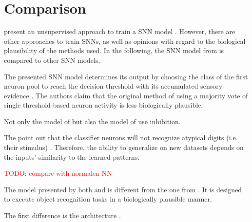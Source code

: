 \section{Comparison}
\label{sec:comparison}

\authorsSNN{} present an unsupervised approach to train a \ac{SNN} model \cite{SNN}.
However, there are other approaches to train \acp{SNN}, as well as opinions with regard to the biological plausibility of the methods used.
In the following, the \ac{SNN} model from \authorsSNN{} \cite{SNN} is compared to other \ac{SNN} models.


The presented \ac{SNN} model determines its output by 
choosing the class of the first neuron pool to reach the decision threshold with its accumulated sensory evidence \cite{STDP_like}.
The authors claim that the original method of using a majority vote of single threshold-based neuron activity is less biologically plausible.

Not only the model of \authorsSTDPlike{} \cite{STDP_like} but also the model of \authorsSNN{} \cite{SNN} use inhibition.

The \authorsSTDPlike{} point out that the classifier neurons will not recognize atypical digits (i.e. their stimulus) \cite{STDP_like}.
Therefore, the ability to generalize on new datasets depends on the inputs' similarity to the learned patterns.


\textcolor{red}{TODO: compare with normalen NN}

The model presented by both \authorsmultiScaleSTDP{} \cite{multi_scale_STDP} and \authorsSTDPvisFeat{} \cite{STDP_vis_feat} is different from the one from \authorsSNN{} \cite{SNN}.
It is designed to execute object recognition tasks in a biologically plausible manner.

The first difference is the architecture \cite{multi_scale_STDP,STDP_vis_feat}.

